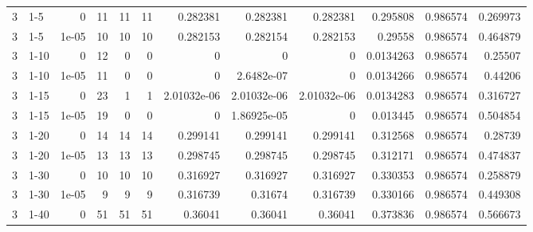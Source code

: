 \begin{tabular}{rlrrrrrrrrrr}
     3 & 1-5    &      0     &          11 &                11 &                11 &     0.282381    &     0.282381    &      0.282381    &        0.295808  &               0.986574 &           0.269973 \\
     3 & 1-5    &      1e-05 &          10 &                10 &                10 &     0.282153    &     0.282154    &      0.282153    &        0.29558   &               0.986574 &           0.464879 \\
     3 & 1-10   &      0     &          12 &                 0 &                 0 &     0           &     0           &      0           &        0.0134263 &               0.986574 &           0.25507  \\
     3 & 1-10   &      1e-05 &          11 &                 0 &                 0 &     0           &     2.6482e-07  &      0           &        0.0134266 &               0.986574 &           0.44206  \\
     3 & 1-15   &      0     &          23 &                 1 &                 1 &     2.01032e-06 &     2.01032e-06 &      2.01032e-06 &        0.0134283 &               0.986574 &           0.316727 \\
     3 & 1-15   &      1e-05 &          19 &                 0 &                 0 &     0           &     1.86925e-05 &      0           &        0.013445  &               0.986574 &           0.504854 \\
     3 & 1-20   &      0     &          14 &                14 &                14 &     0.299141    &     0.299141    &      0.299141    &        0.312568  &               0.986574 &           0.28739  \\
     3 & 1-20   &      1e-05 &          13 &                13 &                13 &     0.298745    &     0.298745    &      0.298745    &        0.312171  &               0.986574 &           0.474837 \\
     3 & 1-30   &      0     &          10 &                10 &                10 &     0.316927    &     0.316927    &      0.316927    &        0.330353  &               0.986574 &           0.258879 \\
     3 & 1-30   &      1e-05 &           9 &                 9 &                 9 &     0.316739    &     0.31674     &      0.316739    &        0.330166  &               0.986574 &           0.449308 \\
     3 & 1-40   &      0     &          51 &                51 &                51 &     0.36041     &     0.36041     &      0.36041     &        0.373836  &               0.986574 &           0.566673 \\

\end{tabular}

